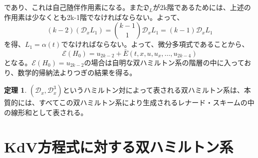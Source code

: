 \documentclass[a4paper, 11pt]{report}
\theoremstyle{definition}
\newtheorem{theorem}{定理}[section]
\begin{document}
であり、これは自己随伴作用素になる。また$\mathfrak{D}_L$が2k階であるためには、上述の作用素は少なくとも2k-1階でなければならない。よって、
\begin{equation*}
(k-2)(\mathcal{D}_xL_1) = \binom{k-1}{1}\mathcal{D}_xL_1 = (k-1)\mathcal{D}_xL_1
\end{equation*}
を得、$L_1=\alpha (t)$でなければならない。よって、微分多項式であることから、
\begin{equation}
\mathcal{E}(H_0) = u_{2k-2} + \bar{E}(t,x,u,u_x,\dots ,u_{2k-4})  %
\end{equation}
となる。$\mathcal{E}(H_0)=u_{2k-2}$の場合は自明な双ハミルトン系の階層の中に入っており、数学的帰納法よりつぎの結果を得る。

\begin{theorem}
 $(\mathcal{D}_x,\mathcal{D}_x^3)$というハミルトン対によって表される双ハミルトン系は、本質的には、すべてこの双ハミルトン系により生成されるレナード・スキームの中の線形和として表される。
\end{theorem}

\section{KdV方程式に対する双ハミルトン系}
\end{document}
